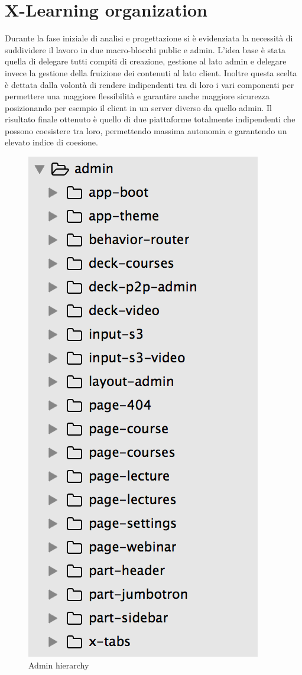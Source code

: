 \section{X-Learning organization}
\label{sec:x-learning_organization}

  Durante la fase iniziale di analisi e progettazione si è evidenziata la necessità di suddividere il lavoro in due macro-blocchi public e admin. L’idea base è stata quella di delegare tutti compiti di creazione, gestione al lato admin e delegare invece la gestione della fruizione dei contenuti al lato client.
Inoltre questa scelta è dettata dalla volontà di rendere indipendenti tra di loro i vari componenti per permettere una maggiore flessibilità e garantire anche maggiore sicurezza posizionando per esempio il client in un server diverso da quello admin.
Il risultato finale ottenuto è quello di due piattaforme totalmente indipendenti che possono coesistere tra loro, permettendo massima autonomia e garantendo un elevato indice di coesione.


\begin{figure}[htbp] %
 \centering
 \includegraphics[width=0.5\linewidth]{images/chapter4/admin.png}\hfill
 \caption[admin hierarchy]{Admin hierarchy}
 \label{fig:fourV}
\end{figure}

